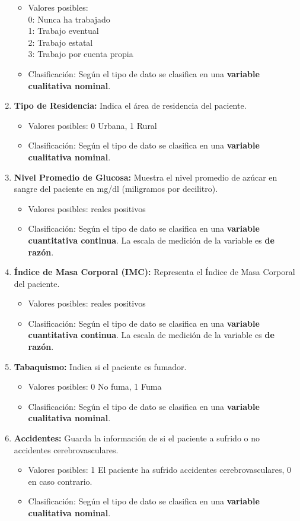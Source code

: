 \documentclass[a4paper, 12pt]{article}
\begin{document}
\begin{enumerate}
    \begin{itemize}
    \item Valores posibles:
    \\
    0: Nunca ha trabajado
    \\
    1: Trabajo eventual
    \\
    2: Trabajo estatal
    \\
    3: Trabajo por cuenta propia
    \item Clasificación: Según el tipo de dato se clasifica en una \textbf{variable cualitativa nominal}.
    \end{itemize}
\item \textbf{Tipo de Residencia:} Indica el área de residencia del paciente.
    \begin{itemize}
    \item Valores posibles: 0 Urbana, 1 Rural
    \item Clasificación: Según el tipo de dato se clasifica en una \textbf{variable cualitativa nominal}.
    \end{itemize}
\item \textbf{Nivel Promedio de Glucosa:} Muestra el nivel promedio de azúcar en sangre del paciente en mg/dl (miligramos por decilitro).
    \begin{itemize}
    \item Valores posibles: reales positivos
    \item Clasificación: Según el tipo de dato se clasifica en una \textbf{variable cuantitativa continua}. La escala de medición de la variable es \textbf{de razón}.
    \end{itemize}
\item \textbf{Índice de Masa Corporal (IMC):} Representa el Índice de Masa Corporal del paciente.
    \begin{itemize}
    \item Valores posibles: reales positivos
    \item Clasificación: Según el tipo de dato se clasifica en una \textbf{variable cuantitativa continua}. La escala de medición de la variable es \textbf{de razón}.
    \end{itemize}
\item \textbf{Tabaquismo:} Indica si el paciente es fumador.
    \begin{itemize}
    \item Valores posibles: 0 No fuma, 1 Fuma
    \item Clasificación: Según el tipo de dato se clasifica en una \textbf{variable cualitativa nominal}.
    \end{itemize}
\item \textbf{Accidentes:} Guarda la información de si el paciente a sufrido o no accidentes cerebrovasculares.   
    \begin{itemize}
    \item Valores posibles: 1 El paciente ha sufrido accidentes cerebrovasculares, 0 en caso contrario.
    \item Clasificación: Según el tipo de dato se clasifica en una \textbf{variable cualitativa nominal}.
    \end{itemize}

\end{enumerate}
\end{document}
